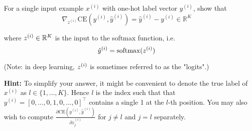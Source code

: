 \item {} 
For a single input example $x^{(i)}$ with one-hot label vector $y^{(i)}$, show that $$\nabla_{z^{(i)}} \mathrm{CE}(y^{(i)}, \hat{y}^{(i)}) = \hat{y}^{(i)} - y^{(i)} \in \mathbb{R}^K$$

where $z^{(i)} \in \mathbb{R}^K$ is the input to the softmax function, i.e. $$\hat{y}^{(i)} = \mathrm{softmax}(z^{(i)})$$

(Note: in deep learning, $z^{(i)}$ is sometimes referred to as the "logits".)

\textbf{Hint:} To simplify your answer, it might be convenient to denote the true label of $x^{(i)}$ as $l \in \{1,\dots,K\}$. Hence $l$ is the index such that that $y^{(i)} = [0,...,0,1,0,...,0]^\top$ contains a single 1 at the $l$-th position. You may also wish to compute $\displaystyle \frac{\partial \mathrm{CE}(y^{(i)}, \hat{y}^{(i)})}{\partial z^{(i)}_j}$ for $j\neq l$ and $j=l$ separately.
